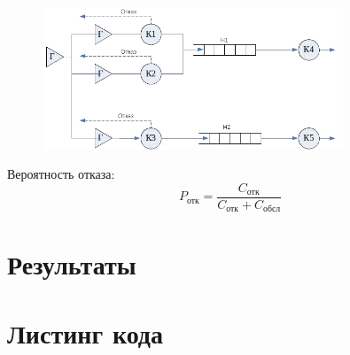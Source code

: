 \begin{figure}[h!]
\centering
\includegraphics[width=0.8\textwidth]{5/5_2}
\end{figure}

Вероятность отказа:
\begin{equation*}
    P_{\text{отк}} = \frac{C_{\text{отк}}}{C_{\text{отк}} + C_{\text{обсл}}}
\end{equation*}

\pagebreak
\section{Результаты}

\begin{figure}[h!]
\centering
{}
\end{figure}

\section{Листинг кода}




\pagebreak
{}

